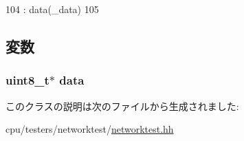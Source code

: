 \begin{DoxyCode}
104             : data(_data)
105         { }
\end{DoxyCode}


\subsection{変数}
\hypertarget{classNetworkTest_1_1NetworkTestSenderState_abe222f6d3581e7920dcad5306cc906a8}{
\subsubsection[{data}]{\setlength{\rightskip}{0pt plus 5cm}uint8\_\-t$\ast$ {\bf data}}}
\label{classNetworkTest_1_1NetworkTestSenderState_abe222f6d3581e7920dcad5306cc906a8}


このクラスの説明は次のファイルから生成されました:\begin{DoxyCompactItemize}
\item 
cpu/testers/networktest/\hyperlink{networktest_8hh}{networktest.hh}\end{DoxyCompactItemize}
